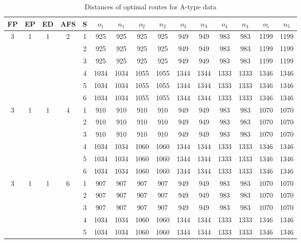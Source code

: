 \begin{longtable}{|c|c|c|c|c|c c|c c|c c|c c|c c|}
\caption{Distances of optimal routes for A-type data}
\label{tab:distance_a} \\
\hline
FP  & EP & ED & AFS & S & $o_1$ & $n_1$ & $o_2$ & $n_2$ & $o_3$ & $n_3$ & $o_4$ & $n_4$ & $o_5$ & $n_5$\\
\hline\hline\multirow{6}{*}{3} & \multirow{6}{*}{1} & \multirow{6}{*}{1} & \multirow{6}{*}{2} & 1 & 925 & 925 & 925 & 925 & 949 & 949 & 983 & 983 & 1199 & 1199 \\
 & & & & 2 & 925 & 925 & 925 & 925 & 949 & 949 & 983 & 983 & 1199 & 1199 \\
 & & & & 3 & 925 & 925 & 925 & 925 & 949 & 949 & 983 & 983 & 1199 & 1199 \\
 & & & & 4 & 1034 & 1034 & 1055 & 1055 & 1344 & 1344 & 1333 & 1333 & 1346 & 1346 \\
 & & & & 5 & 1034 & 1034 & 1055 & 1055 & 1344 & 1344 & 1333 & 1333 & 1346 & 1346 \\
 & & & & 6 & 1034 & 1034 & 1055 & 1055 & 1344 & 1344 & 1333 & 1333 & 1346 & 1346 \\
\hline
\multirow{6}{*}{3} & \multirow{6}{*}{1} & \multirow{6}{*}{1} & \multirow{6}{*}{4} & 1 & 910 & 910 & 910 & 910 & 949 & 949 & 983 & 983 & 1070 & 1070 \\
 & & & & 2 & 910 & 910 & 910 & 910 & 949 & 949 & 983 & 983 & 1070 & 1070 \\
 & & & & 3 & 910 & 910 & 910 & 910 & 949 & 949 & 983 & 983 & 1070 & 1070 \\
 & & & & 4 & 1034 & 1034 & 1060 & 1060 & 1344 & 1344 & 1333 & 1333 & 1346 & 1346 \\
 & & & & 5 & 1034 & 1034 & 1060 & 1060 & 1344 & 1344 & 1333 & 1333 & 1346 & 1346 \\
 & & & & 6 & 1034 & 1034 & 1060 & 1060 & 1344 & 1344 & 1333 & 1333 & 1346 & 1346 \\
\hline
\multirow{6}{*}{3} & \multirow{6}{*}{1} & \multirow{6}{*}{1} & \multirow{6}{*}{6} & 1 & 907 & 907 & 907 & 907 & 949 & 949 & 983 & 983 & 1070 & 1070 \\
 & & & & 2 & 907 & 907 & 907 & 907 & 949 & 949 & 983 & 983 & 1070 & 1070 \\
 & & & & 3 & 907 & 907 & 907 & 907 & 949 & 949 & 983 & 983 & 1070 & 1070 \\
 & & & & 4 & 1034 & 1034 & 1060 & 1060 & 1344 & 1344 & 1333 & 1333 & 1346 & 1346 \\
 & & & & 5 & 1034 & 1034 & 1060 & 1060 & 1344 & 1344 & 1333 & 1333 & 1346 & 1346 \\

\end{longtable}
